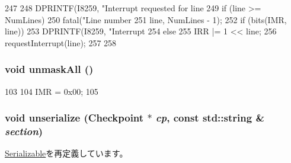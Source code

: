 \begin{DoxyCode}
247 {
248     DPRINTF(I8259, "Interrupt requested for line %
249     if (line >= NumLines)
250         fatal("Line number %
251                 line, NumLines - 1);
252     if (bits(IMR, line)) {
253         DPRINTF(I8259, "Interrupt %
254     } else {
255         IRR |= 1 << line;
256         requestInterrupt(line);
257     }
258 }
\end{DoxyCode}
\hypertarget{classX86ISA_1_1I8259_a08091cbfeb72a8155e4a7fc5b93defa8}{
\subsubsection[{unmaskAll}]{\setlength{\rightskip}{0pt plus 5cm}void unmaskAll ()}}
\label{classX86ISA_1_1I8259_a08091cbfeb72a8155e4a7fc5b93defa8}



\begin{DoxyCode}
103     {
104         IMR = 0x00;
105     }
\end{DoxyCode}
\hypertarget{classX86ISA_1_1I8259_af22e5d6d660b97db37003ac61ac4ee49}{
\subsubsection[{unserialize}]{\setlength{\rightskip}{0pt plus 5cm}void unserialize ({\bf Checkpoint} $\ast$ {\em cp}, \/  const std::string \& {\em section})}}
\label{classX86ISA_1_1I8259_af22e5d6d660b97db37003ac61ac4ee49}


\hyperlink{classSerializable_af100c4e9feabf3cd918619c88c718387}{Serializable}を再定義しています。


